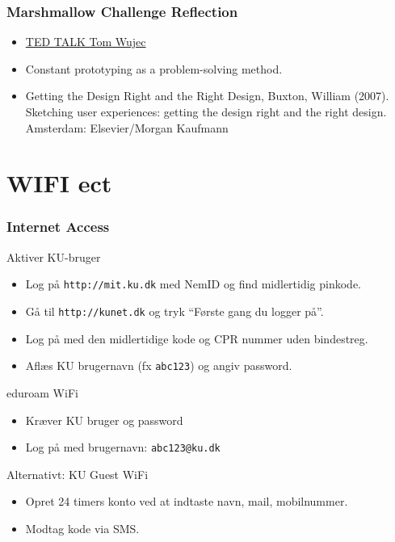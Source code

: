 \documentclass[10pt]{beamer}
\begin{document}
\begin{frame}
   \frametitle{Marshmallow Challenge Reflection}
   	\begin{itemize}
	\item {\href{https://www.ted.com/talks/tom_wujec_build_a_tower_build_a_team?utm_campaign=tedspread&utm_medium=referral&utm_source=tedcomshare}{TED TALK Tom Wujec}}

		\item{Constant prototyping as a problem-solving method.}
		\item{Getting the Design Right and the Right Design, Buxton, William (2007). Sketching user experiences: getting the design right and the right design. Amsterdam: Elsevier/Morgan Kaufmann }
			\end{itemize}
\end{frame}


\section{WIFI ect}
\begin{frame}
  \frametitle{Internet Access}

  Aktiver KU-bruger
  \begin{itemize}
  \item Log på \texttt{http://mit.ku.dk} med NemID og find midlertidig pinkode.
  \item Gå til \texttt{http://kunet.dk} og tryk ``Første gang du logger på''.
  \item Log på med den midlertidige kode og CPR nummer uden bindestreg.
  \item Aflæs KU brugernavn (fx \texttt{abc123}) og angiv password.
  \end{itemize}

  \vspace{5mm} 
  eduroam WiFi
  \begin{itemize}
  \item Kræver KU bruger og password
  \item Log på med brugernavn: \texttt{abc123@ku.dk}
  \end{itemize}

  \vspace{5mm} 
  Alternativt: KU Guest WiFi
  \begin{itemize}
  \item Opret 24 timers konto ved at indtaste navn, mail, mobilnummer. 
  \item Modtag kode via SMS.
  \end{itemize}
\end{frame}
\end{document}
